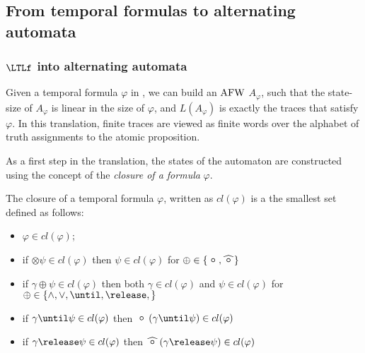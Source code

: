 \subsection{From temporal formulas to alternating automata}

\subsubsection{$\LTLf$ into alternating automata}


Given a temporal formula $\varphi$ in \nnf, we can build an $\mathrm{AFW}$  $A_\varphi$, such that the state-size of $A_\varphi$ is linear in the size of $\varphi$, and $L(A_\varphi)$ is exactly the traces that satisfy $\varphi$. In this translation, finite traces are viewed as finite words over the alphabet of truth assignments to the atomic proposition.

As a first step in the translation, the states of the automaton are constructed using the concept of the \emph{closure of a formula} $\varphi$.

\begin{definition}[Closure]
    The closure of a temporal formula $\varphi$, written as $cl(\varphi)$ is a the smallest set defined as follows:
    \begin{itemize}
        \item $\varphi \in cl(\varphi)$;
        \item if $\otimes \psi \in cl(\varphi)$ then $\psi \in cl(\varphi)$ for $\oplus \in \lbrace \Next, \wnext \rbrace$
        \item if $\gamma \oplus \psi \in cl(\varphi)$ then both $\gamma\in cl(\varphi)$ and $\psi \in cl(\varphi)$ for $\oplus \in \lbrace \wedge, \vee, \until, \release, \rbrace$
        \item if $\gamma \until \psi \in cl(\varphi)$ then $\Next\left( \gamma \until \psi\right) \in cl(\varphi)$
        \item if $\gamma \release \psi \in cl(\varphi)$ then  $\wnext\left( \gamma \release \psi\right) \in cl(\varphi)$
    \end{itemize}
\end{definition}

